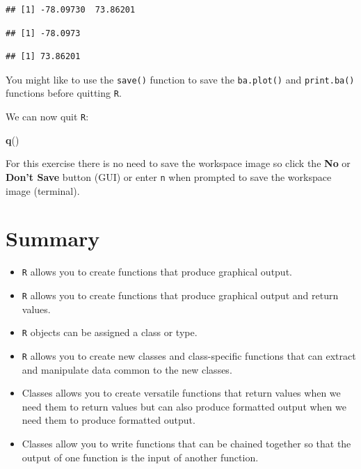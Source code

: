 \documentclass[12pt,]{book}
\newenvironment{Shaded}{\begin{snugshade}}{\end{snugshade}}
\newcommand{\KeywordTok}[1]{\textcolor[rgb]{0.13,0.29,0.53}{\textbf{#1}}}
\newcommand{\NormalTok}[1]{#1}
\theoremstyle{definition}
\theoremstyle{definition}
\theoremstyle{definition}
\theoremstyle{remark}
\begin{document}
\begin{verbatim}
## [1] -78.09730  73.86201
\end{verbatim}

\begin{verbatim}
## [1] -78.0973
\end{verbatim}

\begin{verbatim}
## [1] 73.86201
\end{verbatim}

You might like to use the \texttt{save()} function to save the
\texttt{ba.plot()} and \texttt{print.ba()} functions before quitting
\texttt{R}.

We can now quit \texttt{R}:

\begin{Shaded}
\begin{Highlighting}[]
\KeywordTok{q}\NormalTok{()}
\end{Highlighting}
\end{Shaded}

For this exercise there is no need to save the workspace image so click
the \textbf{No} or \textbf{Don't Save} button (GUI) or enter \texttt{n}
when prompted to save the workspace image (terminal).

\hypertarget{summary-6}{%
\section{Summary}\label{summary-6}}

\begin{itemize}
\item
  \texttt{R} allows you to create functions that produce graphical
  output.
\item
  \texttt{R} allows you to create functions that produce graphical
  output and return values.
\item
  \texttt{R} objects can be assigned a class or type.
\item
  \texttt{R} allows you to create new classes and class-specific
  functions that can extract and manipulate data common to the new
  classes.
\item
  Classes allows you to create versatile functions that return values
  when we need them to return values but can also produce formatted
  output when we need them to produce formatted output.
\item
  Classes allow you to write functions that can be chained together so
  that the output of one function is the input of another function.
\end{itemize}
\end{document}
